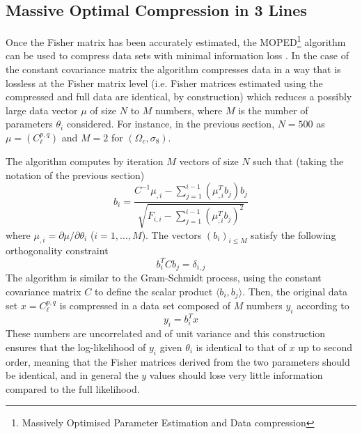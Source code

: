 \documentclass[twocolumn,twocolappendix,nofootinbib,iop]{openjournal}
\newcommand{\FrL}[1]{{\color{cyan}FL: #1}}
\begin{document}
\subsection{Massive Optimal Compression in 3 Lines}


Once the Fisher matrix has been accurately estimated, the MOPED\footnote{Massively Optimised Parameter Estimation and Data compression} algorithm can be used to compress data sets with minimal information loss \citep{2000MNRAS.317..965H,2016PhRvD..93h3525Z, 2017MNRAS.472.4244H}. In the case of the constant covariance matrix the algorithm compresses data in a way that is lossless at the Fisher matrix level (i.e. Fisher matrices estimated using the compressed and full data are identical, by construction)  which reduces a possibly large data vector $\mu$ of size $N$ to $M$ numbers, where $M$ is the number of parameters $\theta_i$ considered. For instance, in the previous section, $N=500$ as $\mu=(C_\ell^{p,q})$ and $M=2$ for $(\Omega_c,\sigma_8)$. 

The algorithm computes by iteration $M$ vectors of size $N$ such that (taking the notation of the previous section)
\begin{equation}
    b_i = \frac{C^{-1}\mu_{,i}-\sum_{j=1}^{i-1}(\mu_{,i}^T b_j)b_j}{\sqrt{F_{i,i}-\sum_{j=1}^{i-1}(\mu_{,i}^T b_j)^2}}
\label{eq:moped}
\end{equation}
where $\mu_{,i}=\partial \mu/\partial \theta_i$ ($i=1,\dots,M$). The vectors $(b_i)_{i\leq M}$ satisfy the following orthogonality constraint
\begin{equation}
    b_i^T C b_j = \delta_{i,j}
\end{equation}
The algorithm is similar to the Gram-Schmidt process, using the constant covariance matrix $C$ to define the scalar product $\langle b_i, b_j\rangle$. Then, the original data set $x=C_\ell^{p,q}$ is compressed in a data set composed of $M$ numbers $y_i$ according to
\begin{equation}
    y_i = b_i^T x
\end{equation}
These numbers are uncorrelated and of unit variance and this construction ensures that the log-likelihood of $y_i$ given  $\theta_i$ is identical to that of $x$ up to second order, meaning that the Fisher matrices derived from the two parameters should be identical, and in general the $y$ values should lose very little information compared to the full likelihood.
\end{document}
